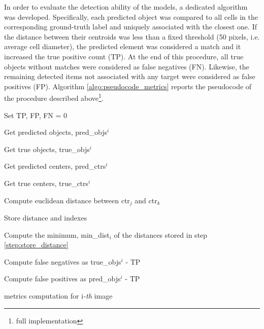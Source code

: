 In order to evaluate the detection ability of the models, a dedicated algorithm was developed.
Specifically, each predicted object was compared to all cells in the corresponding ground-truth label and uniquely associated with the closest one.
If the distance between their centroids was less than a fixed threshold (50 pixels, i.e. average cell diameter), the predicted element was considered a match and it increased the true positive count (TP).
At the end of this procedure, all true objects without matches were considered as false negatives (FN). Likewise, the remaining detected items not associated with any target were considered as false positives (FP).
Algorithm \ref{algo:pseudocode_metrics} reports the pseudocode of the procedure described above\footnote{full implementation \githubmetrics}.
\begin{algorithm}%
    \DontPrintSemicolon
    
    Set TP, FP, FN = 0
    
    Get predicted objects, pred\_objs$^i$
    
    Get true objects, true\_objs$^i$
    
    Get predicted centers, pred\_ctrs$^i$
    
    Get true centers, true\_ctrs$^i$
    
        {
            {
            
             Compute euclidean distance between ctr$_j$ and ctr$_k$ \label{step:ctrs_distance}
             
             Store distance and indexes
             \label{step:store_distance}
            } 
        
         Compute the minimum, min\_dist$_i$ of the distances stored in step \ref{step:store_distance}
         
        
        }
        
    Compute false negatives as true\_objs$^i$ - TP
    
    Compute false positives as pred\_objs$^i$ - TP
    
\caption{metrics computation for i\emph{-th} image}
\label{algo:pseudocode_metrics}
\end{algorithm}
